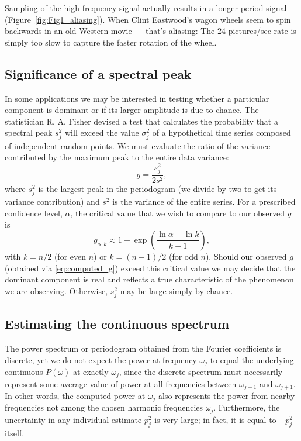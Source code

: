 Sampling of the high-frequency signal actually results in a longer-period signal (Figure~\ref{fig:Fig1_aliasing}).
When Clint Eastwood's wagon wheels seem to spin backwards in an old Western movie --- that's aliasing:  The 24 
pictures/sec rate is simply too slow to capture the faster rotation of the wheel.
	
\subsection{Significance of a spectral peak}
In some applications we may be interested in testing whether a particular 
component is dominant or if its larger amplitude is due to chance.  The statistician R. A. Fisher devised a test that 
calculates the probability that a spectral peak $s_j^2$ will exceed the value $\sigma_j^2$ of a hypothetical time series 
composed of independent random points.  We must evaluate the ratio of the variance contributed by the
maximum peak to the entire data variance:
\begin{equation}
g = \frac{s^2 _j}{2s^2},
\label{eq:computed_g}
\end{equation}
where $s^2_j$ is the largest peak in the periodogram (we divide by two to get its variance contribution)
and $s^2$ is the variance of the entire series.  For 
a prescribed confidence level, $\alpha$, the critical value that we wish to compare to our observed $g$ is
\begin{equation}
g_{\alpha,k} \approx 1 - \exp \left( \frac{\ln \alpha - \ln k}{k-1} \right ),
\label{eq:critical_g}
\end{equation}
with $k = n/2$ (for even $n$) or $k = (n-1)/2$ (for odd $n$).  Should our observed $g$ (obtained via \ref{eq:computed_g}) exceed this 
critical value we may decide that the dominant component is real and reflects a true 
characteristic of the phenomenon we are observing.  Otherwise, $s^2_j$ may be large simply by 
chance.

\subsection{Estimating the continuous spectrum}

	The power spectrum or periodogram obtained from the Fourier coefficients is discrete, yet 
we do not expect the power at frequency $\omega_j$ to equal the underlying continuous $P(\omega)$ at exactly 
$\omega_j$, since the discrete spectrum must necessarily represent some average value of power at all frequencies between $\omega_{j-1}$ and 
$\omega_{j+1}$.  In other words, the computed power at $\omega_j$ also represents the power from nearby frequencies 
not among the chosen harmonic frequencies $\omega_j$.  Furthermore, the uncertainty in any individual 
estimate $p^2_j$ is very large; in fact, it is equal to $\pm p^2_j$ itself.

